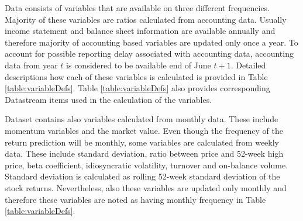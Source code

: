 \documentclass[12pt]{article}
\begin{document}
Data consists of variables that are available on three different frequencies. Majority of these variables are ratios calculated from accounting data. 
Usually income statement and balance sheet information are available annually and therefore majority of accounting based variables are updated only once a year. To account for possible reporting delay associated with accounting data, accounting data from year $t$ is considered to be available end of June $t+1$. Detailed descriptions how each of these variables is calculated is provided in Table \ref{table:variableDefs}. Table \ref{table:variableDefs} also provides corresponding Datastream items used in the calculation of the variables. 

Dataset contains also variables calculated from monthly data. These include momentum variables and the market value. Even though the frequency of the return prediction will be monthly, some variables are calculated from weekly data. These include standard deviation, ratio between price and 52-week high price, beta coefficient, idiosyncratic volatility, turnover and on-balance volume. Standard deviation is calculated as rolling 52-week standard deviation of the stock returns. Nevertheless, also these variables are updated only monthly and therefore these variables are noted as having monthly frequency in Table \ref{table:variableDefs}. \par
\end{document}
